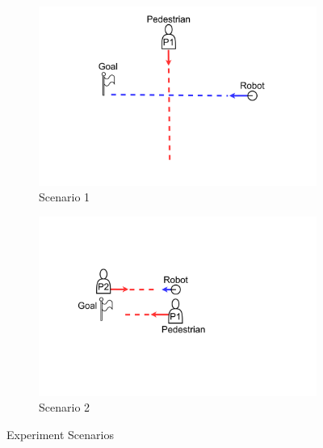 \begin{figure}[H]
  \centering
  \begin{subfigure}{0.80\textwidth}
    \centering
    \includegraphics[keepaspectratio, scale=0.15]{images/scenario1.pdf}
    \caption{Scenario 1}
    \label{Fig:scenario1}
  \end{subfigure}
  \vspace{10pt}
  \begin{subfigure}{0.80\textwidth}
    \centering
    \includegraphics[keepaspectratio, scale=0.15]{images/scenario2.pdf}
    \caption{Scenario 2}
    \label{Fig:scenario2}
  \end{subfigure}
  \caption{Experiment Scenarios}
  \label{Fig:experiment-scenarios}
\end{figure}

\newpage

